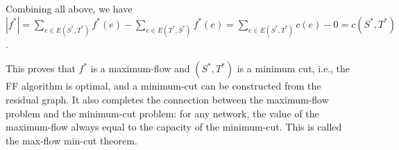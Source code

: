 \documentclass[letterpaper,11pt]{article}
\theoremstyle{mytheorem}
\begin{document}
Combining all above, we have 
$|f^*| = \sum_{e\in E(S^*, T^*)} f^*(e) - \sum_{e\in E(T^*, S^*)} f^*(e)
 = \sum_{e\in E(S^*, T^*)} c(e) - 0 = c(S^*, T^*)$.

This proves that $f^*$ is a maximum-flow and $(S^*,T^*)$ is a minimum cut, i.e., the
FF algorithm is optimal, and a minimum-cut can be constructed from the residual
graph. It also completes the connection between the maximum-flow problem and
the minimum-cut problem: for any network, the value of the maximum-flow
always equal to the capacity of the minimum-cut. This is called the max-flow
min-cut theorem.
\end{document}
